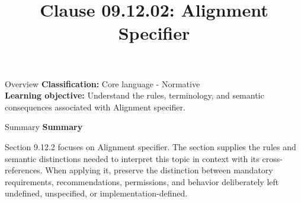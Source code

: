 \documentclass[10pt,letterpaper]{article}
\title{Clause 09.12.02: Alignment Specifier}
\author{}
\date{}
\begin{document}
\maketitle
\begin{CornellOverviewBox}{Overview}
\textbf{Classification:} Core language - Normative\\[2pt]
\textbf{Learning objective:} Understand the rules, terminology, and semantic consequences associated with Alignment specifier.
\end{CornellOverviewBox}\begin{CornellSummaryBox}{Summary}
{\sffamily\bfseries\color{Accent} Summary}\par\vspace{3pt}Section 9.12.2 focuses on Alignment specifier. The section supplies the rules and semantic distinctions needed to interpret this topic in context with its cross-references. When applying it, preserve the distinction between mandatory requirements, recommendations, permissions, and behavior deliberately left undefined, unspecified, or implementation-defined.
\end{CornellSummaryBox}
\end{document}
